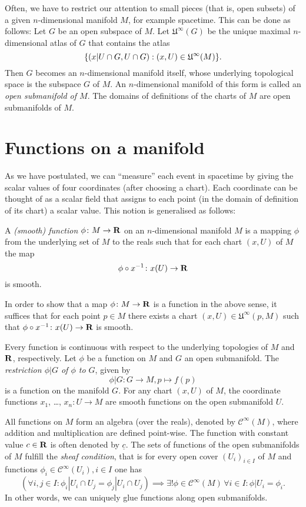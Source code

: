 Often, we have to restrict our attention to small pieces (that is, open subsets)
of a given $n$-dimensional manifold $M$, for example spacetime. This can be
done as follows: Let $G$ be an open subspace of $M$. Let $\mathfrak U^\infty(G)$
be the unique maximal $n$-dimensional atlas of $G$ that contains the atlas
\[
  \lbrace(x|U \cap G, U \cap G) : (x, U) \in \mathfrak U^\infty(M)\rbrace.
\]
Then $G$ becomes an $n$-dimensional manifold itself, whose underlying topological
space is the subspace $G$ of $M$. An $n$-dimensional manifold of this form is
called an \emph{open submanifold of $M$}. The domains of definitions of the charts of
$M$ are open submanifolds of $M$.

\section{Functions on a manifold}
\label{sec:functions}

As we have postulated, we can ``measure'' each event in spacetime by giving the
scalar values of four coordinates (after choosing a chart). Each coordinate can
be thought of as a scalar field that assigns to each point (in the domain of
definition of its chart) a scalar value. This notion is generalised as follows:

\begin{dfn}
  A \emph{(smooth) function $\phi\colon M \to \mathbf{R}$} on an $n$-dimensional
  manifold $M$ is a mapping $\phi$ from the underlying set of $M$ to the reals
  such that for each chart $(x, U)$ of $M$ the map
  \[
    \phi \circ x^{-1}\colon x(U) \to \mathbf{R}
  \]
  is smooth.
\end{dfn}

In order to show that a map $\phi\colon M \to \mathbf{R}$ is a function in the above
sense, it suffices that
for each point $p \in M$ there exists a chart $(x, U) \in \mathfrak U^\infty(p, M)$
such that $\phi \circ x^{-1}\colon x(U) \to \mathbf{R}$ is smooth.

Every function is continuous with respect to the underlying
topologies of $M$ and $\mathbf{R}$, respectively. Let $\phi$ be a function on $M$
and $G$ an open submanifold. The \emph{restriction $\phi|G$ of $\phi$ to $G$},
given by
\[
  \phi|G\colon G \to M, p \mapsto f(p)
\]
is a function on the manifold $G$. For any chart $(x, U)$ of $M$, the coordinate
functions $x_1$, \dots, $x_n\colon U \to M$ are smooth functions on the open
submanifold $U$.

All functions on $M$ form an algebra (over the reals), denoted by
$\mathcal C^\infty(M)$, where addition and multiplication are defined point-wise.
The function with constant value $c \in \mathbf{R}$ is often denoted by $\underline c$.
The sets of functions of the open submanifolds of $M$ fulfill the \emph{sheaf
condition}, that is for every open cover $(U_i)_{i \in I}$ of $M$ and functions
$\phi_i \in \mathcal C^\infty(U_i), i \in I$ one has
\[
  \left(\forall i, j \in I : \phi_i|U_i \cap U_j = \phi_j|U_i \cap U_j\right)
  \implies \exists! \phi \in \mathcal C^\infty(M) \, \forall i \in I :
  \phi|U_i = \phi_i.
\]
In other words, we can uniquely glue functions along open submanifolds.

